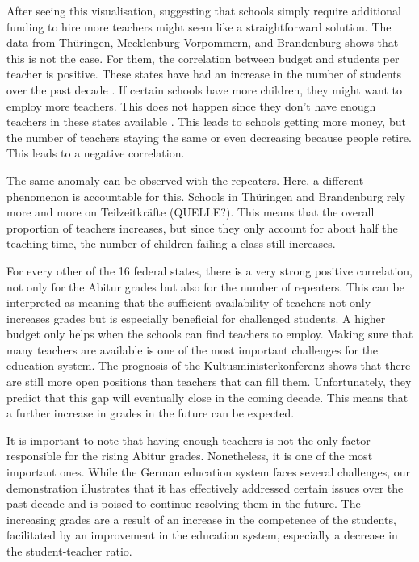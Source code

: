 After seeing this visualisation, suggesting that schools simply require additional funding to hire more teachers might seem like a straightforward solution. The data from Thüringen, Mecklenburg-Vorpommern, and Brandenburg shows that this is not the case. For them, the correlation between budget and students per teacher is positive. These states have had an increase in the number of students over the past decade  \cite{thuringer_ministerium_fur_bildung_jugend_und_sport_verteilung_2023, brandenburger_ministerium_fur_bildung_jugend_und_sport_zahlen_2023,statistisches_amt_mecklenburg-vorpommern_statistik_nodate}. If certain schools have more children, they might want to employ more teachers. This does not happen since they don't have enough teachers in these states available \cite{kultusminister_konferenz_lehrkrafteeinstellungsbedarf_2023}. This leads to schools getting more money, but the number of teachers staying the same or even decreasing because people retire. This leads to a negative correlation.

The same anomaly can be observed with the repeaters. Here, a different phenomenon is accountable for this. Schools in Thüringen and Brandenburg rely more and more on Teilzeitkräfte (QUELLE?). This means that the overall proportion of teachers increases, but since they only account for about half the teaching time, the number of children failing a class still increases.

For every other of the 16 federal states, there is a very strong positive correlation, not only for the Abitur grades but also for the number of repeaters. This can be interpreted as meaning that the sufficient availability of teachers not only increases grades but is especially beneficial for challenged students. A higher budget only helps when the schools can find teachers to employ. Making sure that many teachers are available is one of the most important challenges for the education system. The prognosis of the Kultusministerkonferenz \cite{kultusminister_konferenz_lehrkrafteeinstellungsbedarf_2023} shows that there are still more open positions than teachers that can fill them. Unfortunately, they predict that this gap will eventually close in the coming decade. This means that a further increase in grades in the future can be expected.

It is important to note that having enough teachers is not the only factor responsible for the rising Abitur grades. Nonetheless, it is one of the most important ones. While the German education system faces several challenges, our demonstration illustrates that it has effectively addressed certain issues over the past decade and is poised to continue resolving them in the future. The increasing grades are a result of an increase in the competence of the students, facilitated by an improvement in the education system, especially a decrease in the student-teacher ratio.
